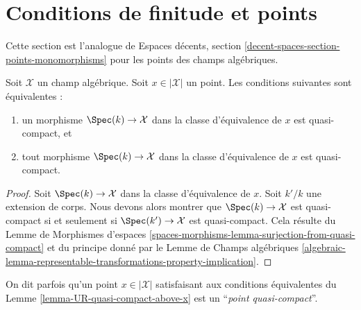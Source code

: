 \section{Conditions de finitude et points}
\label{section-points-conditions}

\noindent
Cette section est l'analogue de
Espaces décents, section \ref{decent-spaces-section-points-monomorphisms}
pour les points des champs algébriques.

\begin{lemma}
\label{lemma-UR-quasi-compact-above-x}
Soit $\mathcal{X}$ un champ algébrique. Soit $x \in |\mathcal{X}|$
un point. Les conditions suivantes sont équivalentes :
\begin{enumerate}
\item un morphisme $\Spec(k) \to \mathcal{X}$ dans la classe d'équivalence
de $x$ est quasi-compact, et
\item tout morphisme $\Spec(k) \to \mathcal{X}$ dans la classe d'équivalence
de $x$ est quasi-compact.
\end{enumerate}
\end{lemma}

\begin{proof}
Soit $\Spec(k) \to \mathcal{X}$ dans la classe d'équivalence
de $x$. Soit $k'/k$ une extension de corps.
Nous devons alors montrer que $\Spec(k) \to \mathcal{X}$ est
quasi-compact si et seulement si $\Spec(k') \to \mathcal{X}$
est quasi-compact. Cela résulte du
Lemme de Morphismes d'espaces
\ref{spaces-morphisms-lemma-surjection-from-quasi-compact}
et du principe donné par le Lemme de Champs algébriques
\ref{algebraic-lemma-representable-transformations-property-implication}.
\end{proof}

\noindent
On dit parfois qu'un point $x \in |\mathcal{X}|$ satisfaisant
aux conditions équivalentes du Lemme \ref{lemma-UR-quasi-compact-above-x}
est un ``{\it point quasi-compact}''.















